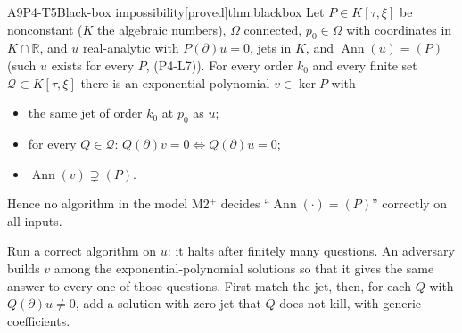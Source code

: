 \documentclass[11pt,a4paper,oneside]{report}
\newcommand{\badge}[2]{\textcolor{#1}{\textsf{\footnotesize[#2]}}}
\newcommand{\proved}{\badge{cC}{proved}}
\newcommand{\led}[1]{\textcolor{cG}{\textsf{\footnotesize(#1)}}}
\newcommand{\R}{\mathbb{R}}\newcommand{\C}{\mathbb{C}}\newcommand{\N}{\mathbb{N}}\newcommand{\Z}{\mathbb{Z}}\newcommand{\Q}{\mathbb{Q}}
\newcommand{\Ann}{\operatorname{Ann}}
\newenvironment{dimcard}[5]{\par\Needspace{12\baselineskip}\begin{dimcardbox}{#1}{#2}{#3}{#4}{#5}}{\end{dimcardbox}}
\begin{document}
\begin{dimcard}{A9}{P4-T5}{Black-box impossibility}{\proved}{thm:blackbox}
Let $P\in K[\tau,\xi]$ be nonconstant ($K$ the algebraic numbers), $\Omega$ connected, $p_0\in\Omega$ with coordinates in $K\cap\R$, and $u$ real-analytic with $P(\partial)u=0$, jets in $K$, and $\Ann(u)=(P)$ (such $u$ exists for every $P$, \led{P4-L7}). For every order $k_0$ and every finite set $\mathcal Q\subset K[\tau,\xi]$ there is an exponential-polynomial $v\in\ker P$ with
\begin{itemize}
\item the same jet of order $k_0$ at $p_0$ as $u$;
\item for every $Q\in\mathcal Q$: $Q(\partial)v=0\iff Q(\partial)u=0$;
\item $\Ann(v)\supsetneq(P)$.
\end{itemize}
Hence no algorithm in the model M2$^+$ decides ``$\Ann(\cdot)=(P)$'' correctly on all inputs.
\end{dimcard}

\begin{proofidea}
Run a correct algorithm on $u$: it halts after finitely many questions. An adversary builds $v$ among the exponential-polynomial solutions so that it gives the same answer to every one of those questions. First match the jet, then, for each $Q$ with $Q(\partial)u\ne0$, add a solution with zero jet that $Q$ does not kill, with generic coefficients.
\end{proofidea}
\end{document}
